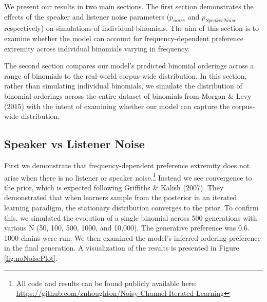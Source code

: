 \documentclass[10pt, letterpaper]{article}
\begin{document}
We present our results in two main sections. The first section
demonstrates the effects of the speaker and listener noise parameters
(\(p_{noise}\) and \(p_{SpeakerNoise}\) respectively) on simulations of
individual binomials. The aim of this section is to examine whether the
model can account for frequency-dependent preference extremity across
individual binomials varying in frequency.

The second section compares our model's predicted binomial orderings
across a range of binomials to the real-world corpus-wide distribution.
In this section, rather than simulating individual binomials, we
simulate the distribution of binomial orderings across the entire
dataset of binomials from Morgan \& Levy (2015) with the intent of
examining whether our model can capture the corpus-wide distribution.

\hypertarget{speaker-vs-listener-noise}{%
\subsection{Speaker vs Listener Noise}\label{speaker-vs-listener-noise}}

First we demonstrate that frequency-dependent preference extremity does
not arise when there is no listener or speaker noise.\footnote{All code
  and results can be found publicly available here:
  \url{https://github.com/znhoughton/Noisy-Channel-Iterated-Learning}}
Instead we see convergence to the prior, which is expected following
Griffiths \& Kalish (2007). They demonstrated that when learners sample
from the posterior in an iterated learning paradigm, the stationary
distribution converges to the prior. To confirm this, we simulated the
evolution of a single binomial across 500 generations with various N
(50, 100, 500, 1000, and 10,000). The generative preference was 0.6.
1000 chains were run. We then examined the model's inferred ordering
preference in the final generation. A visualization of the results is
presented in Figure \ref{fig:noNoisePlot}.
\end{document}
